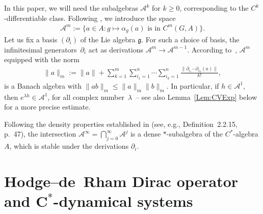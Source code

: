 \documentclass[11pt]{article}
\newcommand{\Aa}{\mathcal{A}}
\newcommand{\LieG}{\mathfrak{g}}
\numberwithin{equation}{section}
\begin{document}
In this paper, we will need the subalgebras $\Aa^k$ for $k \geqslant 0$, corresponding to the $C^k$-dif\/fe\-ren\-tiab\-le class. Following \cite[Section~2.2]{DerivBratteli}, we introduce the space
\begin{gather*}
\Aa^m := \big\{ a \in A\colon g \mapsto \alpha_g(a) \text{ is in }C^m(G, A) \big\}.
\end{gather*}
Let us f\/ix a basis $(\partial _i)$ of the Lie algebra $\LieG$. For such a choice of basis, the inf\/initesimal genera\-tors~$\partial _i$ act as derivations $\Aa^m \to \Aa^{m-1}$. According to~\cite[Example~2.2.4, p.~41]{DerivBratteli}, $\Aa^m$ equipped with the norm
\begin{gather*}
\| a \|_m := \|a \| + \sum_{k=1}^m \sum_{i_1=1}^n \cdots \sum_{i_k=1}^n \frac{\| \partial_{i_1} \cdots \partial_{i_k}(a) \|}{k !},
\end{gather*}
is a Banach algebra with $\|a b \|_m \leqslant \| a \|_m \| b\|_m$. In particular, if $h \in \Aa^1$, then $e^{\lambda h} \in \Aa^1$, for all complex number~$\lambda$~-- see also Lemma~\ref{Lem:CVExp} below for a more precise estimate.

Following the density properties established in \cite{DerivBratteli} (see, e.g., Def\/inition~2.2.15, p.~47), the intersection $\Aa^\infty = \bigcap_{j=0}^\infty \Aa^j$ is a dense $*$-subalgebra of the $C^*$-algebra $A$, which is stable under the derivations $\partial _i$.

\section[Hodge--de~Rham Dirac operator and $C^*$-dynamical systems]{Hodge--de~Rham Dirac operator and $\boldsymbol{C^*}$-dynamical systems}
\label{Sec:HodgeOperator}
\end{document}
